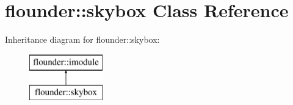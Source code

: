 \hypertarget{classflounder_1_1skybox}{}\section{flounder\+:\+:skybox Class Reference}
\label{classflounder_1_1skybox}
Inheritance diagram for flounder\+:\+:skybox\+:\begin{figure}[H]
\begin{center}
\leavevmode
\includegraphics[height=2.000000cm]{classflounder_1_1skybox}
\end{center}
\end{figure}
